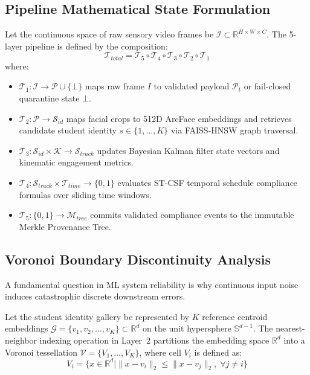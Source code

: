 \documentclass[10pt,journal,compsoc]{IEEEtran}
\begin{document}
\subsection{Pipeline Mathematical State Formulation}
Let the continuous space of raw sensory video frames be $\mathcal{I} \subset \mathbb{R}^{H \times W \times C}$. The 5-layer pipeline is defined by the composition:
\begin{equation}
\mathcal{T}_{total} = \mathcal{T}_5 \circ \mathcal{T}_4 \circ \mathcal{T}_3 \circ \mathcal{T}_2 \circ \mathcal{T}_1
\end{equation}
where:
\begin{itemize}
    \item $\mathcal{T}_1: \mathcal{I} \to \mathcal{P} \cup \{\bot\}$ maps raw frame $I$ to validated payload $\mathcal{P}_t$ or fail-closed quarantine state $\bot$.
    \item $\mathcal{T}_2: \mathcal{P} \to \mathcal{S}_{id}$ maps facial crops to 512D ArcFace embeddings and retrieves candidate student identity $s \in \{1, \dots, K\}$ via FAISS-HNSW graph traversal.
    \item $\mathcal{T}_3: \mathcal{S}_{id} \times \mathcal{K} \to \mathcal{S}_{track}$ updates Bayesian Kalman filter state vectors and kinematic engagement metrics.
    \item $\mathcal{T}_4: \mathcal{S}_{track} \times \mathcal{T}_{time} \to \{0, 1\}$ evaluates ST-CSF temporal schedule compliance formulas over sliding time windows.
    \item $\mathcal{T}_5: \{0, 1\} \to \mathcal{M}_{tree}$ commits validated compliance events to the immutable Merkle Provenance Tree.
\end{itemize}

\subsection{Voronoi Boundary Discontinuity Analysis}
A fundamental question in ML system reliability is why continuous input noise induces catastrophic discrete downstream errors.

Let the student identity gallery be represented by $K$ reference centroid embeddings $\mathcal{G} = \{v_1, v_2, \dots, v_K\} \subset \mathbb{R}^d$ on the unit hypersphere $\mathbb{S}^{d-1}$. The nearest-neighbor indexing operation in Layer~2 partitions the embedding space $\mathbb{R}^d$ into a Voronoi tessellation $\mathcal{V} = \{V_1, \dots, V_K\}$, where cell $V_i$ is defined as:
\begin{equation}
V_i = \{ x \in \mathbb{R}^d \mid \|x - v_i\|_2 \le \|x - v_j\|_2, \; \forall j \neq i \}
\end{equation}
\end{document}
